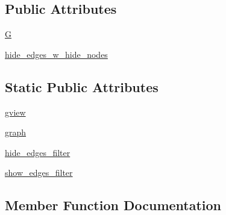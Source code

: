 \subsection*{Public Attributes}
\begin{DoxyCompactItemize}
\item 
\hyperlink{classnetworkx_1_1classes_1_1tests_1_1test__subgraphviews_1_1TestSubGraphView_a9bae12f2e0d9456f3ebb977f978d15d9}{G}
\item 
\hyperlink{classnetworkx_1_1classes_1_1tests_1_1test__subgraphviews_1_1TestSubGraphView_ab62afd162f44b96673af6e0353bac7bc}{hide\+\_\+edges\+\_\+w\+\_\+hide\+\_\+nodes}
\end{DoxyCompactItemize}
\subsection*{Static Public Attributes}
\begin{DoxyCompactItemize}
\item 
\hyperlink{classnetworkx_1_1classes_1_1tests_1_1test__subgraphviews_1_1TestSubGraphView_abea371c926191675fa084dafae227de6}{gview}
\item 
\hyperlink{classnetworkx_1_1classes_1_1tests_1_1test__subgraphviews_1_1TestSubGraphView_aeaa4645aa1f932480e6cb8695d4b6da9}{graph}
\item 
\hyperlink{classnetworkx_1_1classes_1_1tests_1_1test__subgraphviews_1_1TestSubGraphView_ad021f00faff4c0a9d2070f7f49b90f79}{hide\+\_\+edges\+\_\+filter}
\item 
\hyperlink{classnetworkx_1_1classes_1_1tests_1_1test__subgraphviews_1_1TestSubGraphView_ad14afbba3b1c02ada76ed5313894ea24}{show\+\_\+edges\+\_\+filter}
\end{DoxyCompactItemize}


\subsection{Member Function Documentation}
\mbox{\label{classnetworkx_1_1classes_1_1tests_1_1test__subgraphviews_1_1TestSubGraphView_a85cf43f297be9b2deeb076a5dd1d71aa}} 
